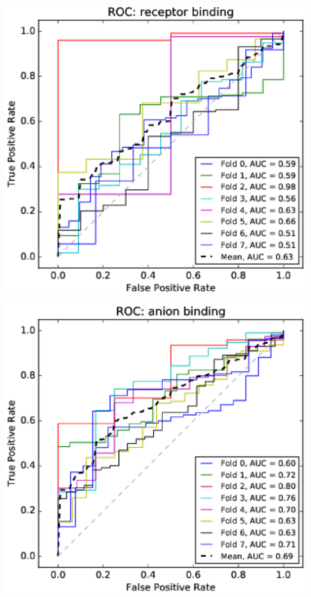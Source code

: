 \documentclass[11pt,twoside,a4paper]{book}
\newenvironment{Figure}
  {\par\medskip\noindent\minipage{\linewidth}}
  {\endminipage\par\medskip}
\begin{document}
\begin{multicols}{2}
\begin{Figure}\begin{center}\includegraphics[width=\linewidth]{figures/roc_receptor_binding}\label{fig:roc_receptor_binding}\end{center}\end{Figure}
\begin{Figure}\begin{center}\includegraphics[width=\linewidth]{figures/roc_anion_binding}\label{fig:roc_anion_binding}\end{center}\end{Figure}

\end{multicols}
\end{document}
